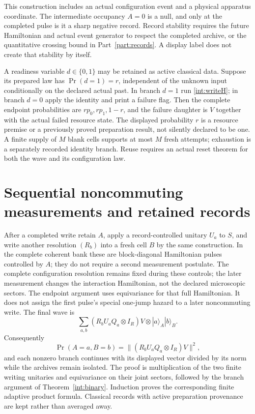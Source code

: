 \documentclass[11pt,oneside,openany]{book}
\theoremstyle{definition}
\theoremstyle{remark}\newtheorem{remark}[theorem]{Remark}
\begin{document}
This construction includes an actual configuration event and a physical apparatus coordinate. The intermediate occupancy $A=0$ is a null, and only at the completed pulse is it a sharp negative record. Record stability requires the future Hamiltonian and actual event generator to respect the completed archive, or the quantitative crossing bound in Part~\ref{part:records}. A display label does not create that stability by itself.

A readiness variable $d\in\{0,1\}$ may be retained as active classical data. Suppose its prepared law has $\Pr(d=1)=r$, independent of the unknown input conditionally on the declared actual past. In branch $d=1$ run \eqref{int:writeH}; in branch $d=0$ apply the identity and print a failure flag. Then the complete endpoint probabilities are $rp_0,rp_1,1-r$, and the failure daughter is $V$ together with the actual failed resource state. The displayed probability $r$ is a resource premise or a previously proved preparation result, not silently declared to be one. A finite supply of $M$ blank cells supports at most $M$ fresh attempts; exhaustion is a separately recorded identity branch. Reuse requires an actual reset theorem for both the wave and its configuration law.

\section{Sequential noncommuting measurements and retained records}
After a completed write retain $A$, apply a record-controlled unitary $U_a$ to $S$, and write another resolution $(R_b)$ into a fresh cell $B$ by the same construction. In the complete coherent bank these are block-diagonal Hamiltonian pulses controlled by $A$; they do not require a second measurement postulate. The complete configuration resolution remains fixed during these controls; the later measurement changes the interaction Hamiltonian, not the declared microscopic sectors. The endpoint argument uses equivariance for that full Hamiltonian. It does not assign the first pulse's special one-jump hazard to a later noncommuting write. The final wave is
\begin{equation}\label{int:seqwave}
 \sum_{a,b}(R_bU_aQ_a\otimes I_R)V\otimes|a\rangle_A|b\rangle_B.
\end{equation}
Consequently
\begin{equation}\label{int:seqBorn}
 \Pr(A=a,B=b)=\|(R_bU_aQ_a\otimes I_R)V\|^2,
\end{equation}
and each nonzero branch continues with its displayed vector divided by its norm while the archives remain isolated. The proof is multiplication of the two finite writing unitaries and equivariance on their joint sectors, followed by the branch argument of Theorem~\ref{int:binary}. Induction proves the corresponding finite adaptive product formula. Classical records with active preparation provenance are kept rather than averaged away.
\end{document}
